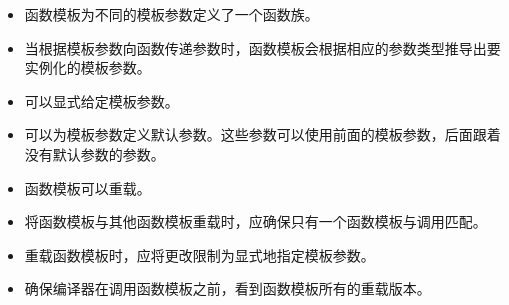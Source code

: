 
\begin{itemize}
\item
函数模板为不同的模板参数定义了一个函数族。

\item 
当根据模板参数向函数传递参数时，函数模板会根据相应的参数类型推导出要实例化的模板参数。

\item
可以显式给定模板参数。

\item 
可以为模板参数定义默认参数。这些参数可以使用前面的模板参数，后面跟着没有默认参数的参数。

\item
函数模板可以重载。

\item 
将函数模板与其他函数模板重载时，应确保只有一个函数模板与调用匹配。

\item
重载函数模板时，应将更改限制为显式地指定模板参数。

\item 
确保编译器在调用函数模板之前，看到函数模板所有的重载版本。
\end{itemize}